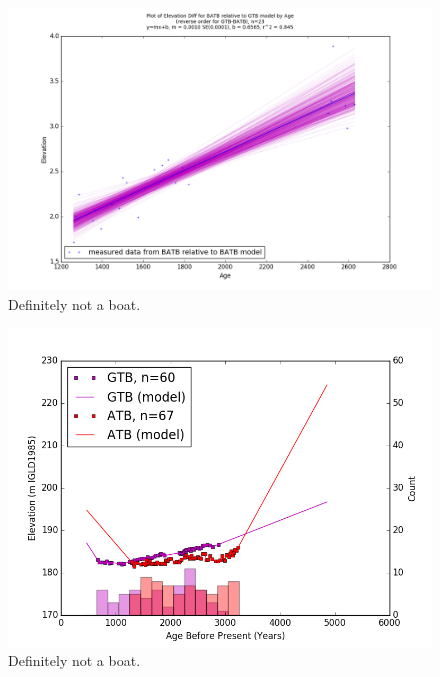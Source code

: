 \documentclass{article}
\begin{document}
\begin{figure}[h]
	\includegraphics[width=\linewidth]{data/gias/theGIA_BATB_relative_to_GTB.png}
	\caption{Definitely not a boat.}
	\label{fig:gias_BATBxGTB}
\end{figure}
\newpage









\begin{figure}[h]
	\includegraphics[width=\linewidth]{data/GTB-ATB_DataAndModel.png}
	\caption{Definitely not a boat.}
	\label{fig:data_GTBxATB}
\end{figure}
\newpage
\end{document}
